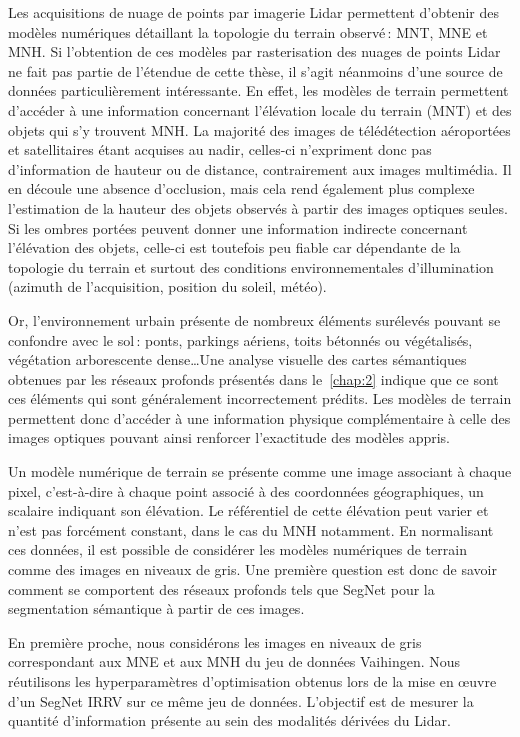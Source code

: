 Les acquisitions de nuage de points par imagerie \gls{Lidar} permettent d'obtenir des modèles numériques détaillant la topologie du terrain observé\,: \gls{MNT}, \gls{MNE} et \gls{MNH}. Si l'obtention de ces modèles par rasterisation des nuages de points \gls{Lidar} ne fait pas partie de l'étendue de cette thèse, il s'agit néanmoins d'une source de données particulièrement intéressante. En effet, les modèles de terrain permettent d'accéder à une information concernant l'élévation locale du terrain (\gls{MNT}) et des objets qui s'y trouvent \gls{MNH}. La majorité des images de télédétection aéroportées et satellitaires étant acquises au nadir, celles-ci n'expriment donc pas d'information de hauteur ou de distance, contrairement aux images multimédia. Il en découle une absence d'occlusion, mais cela rend également plus complexe l'estimation de la hauteur des objets observés à partir des images optiques seules. Si les ombres portées peuvent donner une information indirecte concernant l'élévation des objets, celle-ci est toutefois peu fiable car dépendante de la topologie du terrain et surtout des conditions environnementales d'illumination (azimuth de l'acquisition, position du soleil, météo).

Or, l'environnement urbain présente de nombreux éléments surélevés pouvant se confondre avec le sol\,: ponts, parkings aériens, toits bétonnés ou végétalisés, végétation arborescente dense\dots Une analyse visuelle des cartes sémantiques obtenues par les réseaux profonds présentés dans le~\cref{chap:2} indique que ce sont ces éléments qui sont généralement incorrectement prédits. Les modèles de terrain permettent donc d'accéder à une information physique complémentaire à celle des images optiques pouvant ainsi renforcer l'exactitude des modèles appris.

Un modèle numérique de terrain se présente comme une image associant à chaque pixel, c'est-à-dire à chaque point associé à des coordonnées géographiques, un scalaire indiquant son élévation. Le référentiel de cette élévation peut varier et n'est pas forcément constant, dans le cas du \gls{MNH} notamment. En normalisant ces données, il est possible de considérer les modèles numériques de terrain comme des images en niveaux de gris. Une première question est donc de savoir comment se comportent des réseaux profonds tels que SegNet pour la segmentation sémantique à partir de ces images.

En première proche, nous considérons les images en niveaux de gris correspondant aux \gls{MNE} et aux \gls{MNH} du jeu de données  Vaihingen. Nous réutilisons les hyperparamètres d'optimisation obtenus lors de la mise en \oe{}uvre d'un SegNet \gls{IRRV} sur ce même jeu de données. L'objectif est de mesurer la quantité d'information présente au sein des modalités dérivées du \gls{Lidar}.

